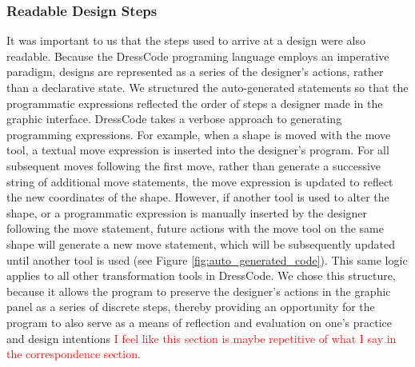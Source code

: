 \documentclass{sigchi}
\begin{document}
\subsubsection{Readable Design Steps}
 It was important to us that the steps used to arrive at a design were also readable. Because the DressCode programing language employs an imperative paradigm, designs are represented as a series of the designer's actions, rather than a declarative state. We structured the auto-generated statements so that the programmatic expressions reflected the order of steps a designer made in the graphic interface. DressCode takes a verbose approach to generating programming expressions. For example, when a shape is moved with the move tool, a textual move expression is inserted into the designer's program. For all subsequent moves following the first move, rather than generate a successive string of additional move statements, the move expression is updated to reflect the new coordinates of the shape. However, if another tool is used to alter the shape, or a programmatic expression is manually inserted by the designer following the move statement, future actions with the move tool on the same shape will generate a new move statement, which will be subsequently updated until another tool is used (see Figure \ref{fig:auto_generated_code}). This same logic applies to all other transformation tools in DressCode. We chose this structure, because it allows the program to preserve the designer's actions in the graphic panel as a series of discrete steps, thereby providing an opportunity for the program to also serve as a means of reflection and evaluation on one's practice and design intentions \textcolor{red}{I feel like this section is maybe repetitive of what I say in the correspondence section}. 
\end{document}

